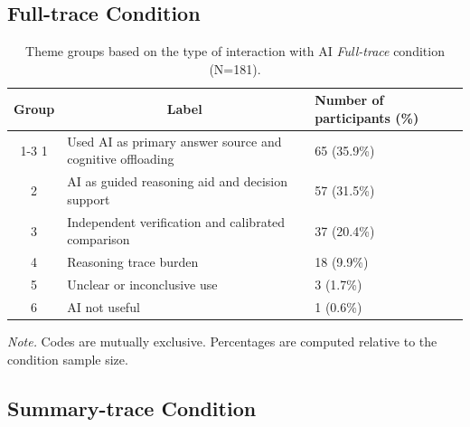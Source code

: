 \documentclass[manuscript,review,anonymous]{acmart}
\begin{document}
\subsection{Full-trace Condition}
\begin{table}[H]
\centering
\caption{Theme groups based on the type of interaction with AI \textit{Full-trace} condition (N=181).}
\begin{tabular}{cll}
\hline
Group & \multicolumn{1}{c}{Label}                                            & Number of participants (\%)        \\ \cline{1-3}
1   & Used AI as primary answer source and cognitive offloading  & 65 (35.9\%)     \\    %
2     & AI as guided reasoning aid and decision support    & 57 (31.5\%)   \\
3     & Independent verification and calibrated comparison & 37 (20.4\%)   \\
4     & Reasoning trace burden                           & 18 (9.9\%)     \\
5     & Unclear or inconclusive use                           & 3 (1.7\%)     \\
6     & AI not useful                                    & 1 (0.6\%)    \\
\hline
\end{tabular}

\raggedright \small \textit{Note.} Codes are mutually exclusive. Percentages are computed relative to the condition sample size.
\label{tab:qualitative_C2}
\end{table}

\subsection{Summary-trace Condition}
\end{document}
